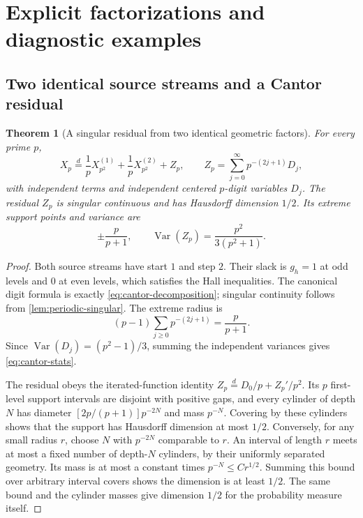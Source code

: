 \documentclass[11pt,a4paper]{article}
\newtheorem{theorem}{Theorem}[section]
\theoremstyle{remark}
\newcommand{\eqd}{\overset{d}{=}}
\DeclareMathOperator{\Var}{Var}
\begin{document}
\section{Explicit factorizations and diagnostic examples}
\label{sec:examples}

\subsection{Two identical source streams and a Cantor residual}

\begin{theorem}[A singular residual from two identical geometric factors]
\label{thm:cantor-example}
For every prime $p$,
\begin{equation}
 X_p\eqd\frac1pX_{p^2}^{(1)}+\frac1pX_{p^2}^{(2)}+Z_p,
 \qquad
 Z_p=\sum_{j=0}^{\infty}p^{-(2j+1)}D_j,
 \label{eq:cantor-decomposition}
\end{equation}
with independent terms and independent centered $p$-digit variables $D_j$.
The residual $Z_p$ is singular continuous and has Hausdorff dimension $1/2$.
Its extreme support points and variance are
\begin{equation}
 \pm\frac{p}{p+1},\qquad
 \Var(Z_p)=\frac{p^2}{3(p^2+1)}.
 \label{eq:cantor-stats}
\end{equation}
\end{theorem}
\begin{proof}
Both source streams have start $1$ and step $2$. Their slack is
$g_h=1$ at odd levels and $0$ at even levels, which satisfies the Hall
inequalities. The canonical digit formula is exactly
\eqref{eq:cantor-decomposition}; singular continuity follows from
\cref{lem:periodic-singular}. The extreme radius is
\[
 (p-1)\sum_{j\ge0}p^{-(2j+1)}=\frac{p}{p+1}.
\]
Since $\Var(D_j)=(p^2-1)/3$, summing the independent variances gives
\eqref{eq:cantor-stats}.

The residual obeys the iterated-function identity
$Z_p\eqd D_0/p+Z_p'/p^2$. Its $p$ first-level support intervals are disjoint
with positive gaps, and every cylinder of depth $N$ has diameter
$[2p/(p+1)]p^{-2N}$ and mass $p^{-N}$. Covering by these cylinders shows that
the support has Hausdorff dimension at most $1/2$. Conversely, for any small
radius $r$, choose $N$ with $p^{-2N}$ comparable to $r$. An interval of
length $r$ meets at most a fixed number of depth-$N$ cylinders, by their
uniformly separated geometry. Its mass is at most a constant times
$p^{-N}\le C r^{1/2}$. Summing this bound over arbitrary interval covers
shows the dimension is at least $1/2$. The same bound and the cylinder
masses give dimension $1/2$ for the probability measure itself.
\end{proof}
\end{document}
